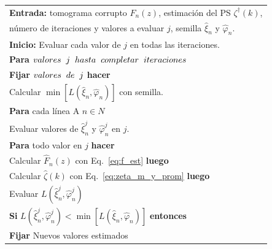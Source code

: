 \begin{algorithm}
	\begin{tabularx}{0.8\textwidth}{l}
		
		\textbf{Entrada:} tomograma corrupto $F_n(z)$, estimación del PS $\zeta^\dagger(k)$,\\
		número de iteraciones y valores a evaluar $j$, semilla $\hat{\xi}_n$ y $\hat{\varphi}_n$.\\
		\hline
		\hspace*{0.6cm}\textbf{Inicio:} Evaluar cada valor de $j$ en todas las iteraciones.\\
		\hspace*{0.6cm}\textbf{Para} $valores \hspace*{0.2cm} j \hspace*{0.2cm} hasta \hspace*{0.2cm} completar \hspace*{0.2cm} iteraciones$\\
		\hspace*{0.9cm} \textbf{Fijar} $valores \hspace*{0.2cm} de \hspace*{0.2cm} j$ \textbf{hacer}\\
		\hspace*{0.9cm} Calcular $\min[L(\hat{\xi}_n,\hat{\varphi}_n)]$ con semilla.\\
		\hspace*{0.9cm} \textbf{Para} cada línea A $n\in N$\\
		\hspace*{1.2cm} Evaluar valores de $\hat{\xi}^j_n$ y $\hat{\varphi}^j_n$ en $j$.\\
		\hspace*{1.2cm} \textbf{Para} todo valor en $j$ \textbf{hacer}\\
		\hspace*{1.5cm} Calcular $\hat{F}_n(z)$ con Eq.~\ref{eq:f_est} \textbf{luego}\\ 
		\hspace*{1.5cm} Calcular $\hat{\zeta}(k)$ con Eq.~\ref{eq:zeta_m_y_prom} \textbf{luego}\\
		\hspace*{1.5cm} Evaluar $L(\hat{\xi}^j_n,\hat{\varphi}^j_n)$\\
		\hspace*{1.5cm} \textbf{Si} $L(\hat{\xi}^j_n,\hat{\varphi}^j_n) < \min[L(\hat{\xi}_n,\hat{\varphi}_n)]$ \textbf{entonces}\\
		\hspace*{1.8cm} \textbf{Fijar} Nuevos valores estimados\\

\end{tabularx}
\end{algorithm}
